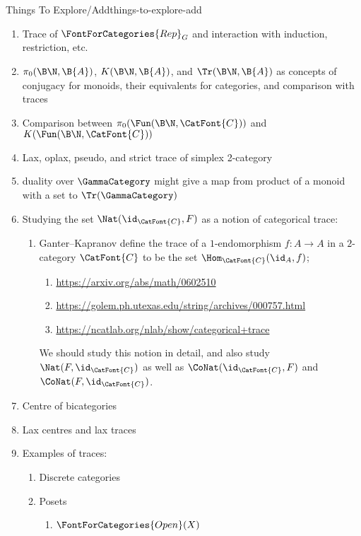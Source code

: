 \begin{remark}{Things To Explore/Add}{things-to-explore-add}
\begin{enumerate}
        \item Trace of $\FontForCategories{Rep}_{G}$ and interaction with induction, restriction, etc.
        \item $\pi_{0}(\B\N,\B{A})$, $K(\B\N,\B{A})$, and $\Tr(\B\N,\B{A})$ as concepts of conjugacy for monoids, their equivalents for categories, and comparison with traces
        \item Comparison between $\pi_{0}(\Fun(\B\N,\CatFont{C}))$ and $K(\Fun(\B\N,\CatFont{C}))$
        \item Lax, oplax, pseudo, and strict trace of simplex 2-category
        \item duality over $\GammaCategory$ might give a map from product of a monoid with a set to $\Tr(\GammaCategory)$
        \item Studying the set $\Nat(\id_{\CatFont{C}},F)$ as a notion of categorical trace:
            \begin{enumerate}
                \item Ganter–Kapranov define the trace of a $1$-endomorphism $f\colon A\to A$ in a $2$-category $\CatFont{C}$ to be the set $\Hom_{\CatFont{C}}(\id_{A},f)$;
                    \begin{enumerate}
                        \item \url{https://arxiv.org/abs/math/0602510}
                        \item \url{https://golem.ph.utexas.edu/string/archives/000757.html}
                        \item \url{https://ncatlab.org/nlab/show/categorical+trace}
                    \end{enumerate}
                    We should study this notion in detail, and also study $\Nat(F,\id_{\CatFont{C}})$ as well as $\CoNat(\id_{\CatFont{C}},F)$ and $\CoNat(F,\id_{\CatFont{C}})$.
            \end{enumerate}
        \item Centre of bicategories
        \item Lax centres and lax traces
        \item Examples of traces:
            \begin{enumerate}
                \item Discrete categories
                \item Posets
                    \begin{enumerate}
                        \item $\FontForCategories{Open}(X)$
                    \end{enumerate}

\end{enumerate}
\end{enumerate}
\end{remark}
